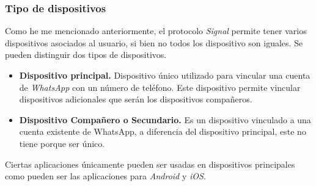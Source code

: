 \subsubsection{Tipo de dispositivos}
Como he me mencionado anteriormente, el protocolo \emph{Signal} permite tener varios dispositivos asociados al usuario, si bien no todos los dispositivo son iguales. Se pueden distinguir dos tipos de dispositivos.
\begin{itemize}
	\item \textbf{Dispositivo principal.} Dispositivo único utilizado para vincular una cuenta de \emph{WhatsApp} con un número de teléfono. Este dispositivo permite vincular dispositivos adicionales que serán los dispositivos compañeros.
	\item \textbf{Dispositivo Compañero o Secundario.} Es un dispositivo vinculado a una cuenta existente de WhatsApp, a diferencia del dispositivo principal, este no tiene porque ser único.
\end{itemize}
Ciertas aplicaciones únicamente pueden ser usadas en dispositivos principales como pueden ser las aplicaciones para \emph{Android} y \emph{iOS}.

